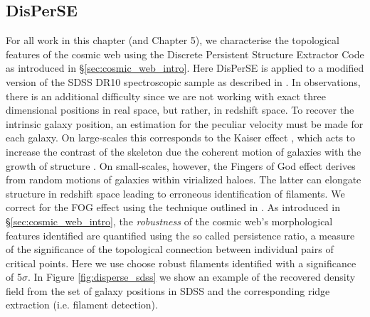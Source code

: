 \subsection{DisPerSE} \label{sec:disperse_sdss}
For all work in this chapter (and Chapter 5), we characterise the topological features of the cosmic web using the Discrete Persistent Structure Extractor Code \citep{sousbie2011a, sousbie2011b} as introduced in \S\ref{sec:cosmic_web_intro}. Here DisPerSE is applied to a modified version of the SDSS DR10 spectroscopic sample as described in \citet{tempel2014}. In observations, there is an additional difficulty since we are not working with exact three dimensional positions in real space, but rather, in redshift space. To recover the intrinsic galaxy position, an estimation for the peculiar velocity must be made for each galaxy. On large-scales this corresponds to the Kaiser effect \citep{kaiser1987}, which acts to increase the contrast of the skeleton due the coherent motion of galaxies with the growth of structure \citep[e.g.][]{shi2016}. On small-scales, however, the Fingers of God effect \citep[FOG;][]{jackson1972,tulley1978} derives from random motions of galaxies within virialized haloes. The latter can elongate structure in redshift space leading to erroneous identification of filaments. We correct for the FOG effect using the technique outlined in \citet{kraljic2018}. As introduced in \S\ref{sec:cosmic_web_intro}, the \textit{robustness} of the cosmic web's morphological features identified are quantified using the so called persistence ratio, a measure of the significance of the topological connection between individual pairs of critical points. Here we use choose robust filaments identified with a significance of 5$\sigma$. In Figure \ref{fig:disperse_sdss} we show an example of the recovered density field from the set of galaxy positions in SDSS and the corresponding ridge extraction (i.e. filament detection). 

